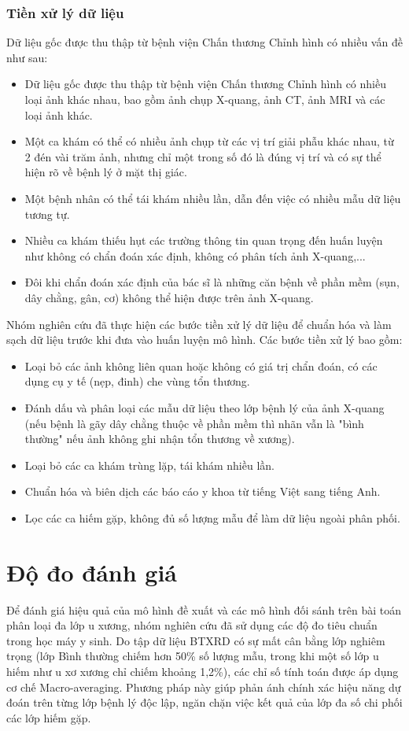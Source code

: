 \subsubsection{Tiền xử lý dữ liệu}
Dữ liệu gốc được thu thập từ bệnh viện Chấn thương Chỉnh hình có nhiều vấn đề như sau:
\begin{itemize}
    \item Dữ liệu gốc được thu thập từ bệnh viện Chấn thương Chỉnh hình có nhiều loại ảnh khác nhau, bao gồm ảnh chụp X-quang, ảnh CT, ảnh MRI và các loại ảnh khác. 
    \item Một ca khám có thể có nhiều ảnh chụp từ các vị trí giải phẫu khác nhau, từ 2 đén vài trăm ảnh, 
    nhưng chỉ một trong số đó là đúng vị trí và có sự thể hiện rõ về bệnh lý ở mặt thị giác. 
    \item Một bệnh nhân có thể tái khám nhiều lần, dẫn đến việc có nhiều mẫu dữ liệu tương tự.
    \item Nhiều ca khám thiếu hụt các trường thông tin quan trọng đến huấn luyện như không có chẩn đoán xác định, không có phân tích ảnh X-quang,...
    \item Đôi khi chẩn đoán xác định của bác sĩ là những căn bệnh về phần mềm (sụn, dây chằng, gân, cơ) không thể hiện được trên ảnh X-quang.
\end{itemize}
Nhóm nghiên cứu đã thực hiện các bước tiền xử lý dữ liệu để chuẩn hóa và làm sạch dữ liệu trước khi đưa vào huấn luyện mô hình.
Các bước tiền xử lý bao gồm:
\begin{itemize}
    \item Loại bỏ các ảnh không liên quan hoặc không có giá trị chẩn đoán, có các dụng cụ y tế (nẹp, đinh) che vùng tổn thương.
    \item Đánh dấu và phân loại các mẫu dữ liệu theo lớp bệnh lý của ảnh X-quang 
    (nếu bệnh là gãy dây chằng thuộc về phần mềm thì nhãn vẫn là "bình thường" nếu ảnh không ghi nhận tổn thương về xương).
    \item Loại bỏ các ca khám trùng lặp, tái khám nhiều lần.
    \item Chuẩn hóa và biên dịch các báo cáo y khoa từ tiếng Việt sang tiếng Anh.
    \item Lọc các ca hiếm gặp, không đủ số lượng mẫu để làm dữ liệu ngoài phân phối.
\end{itemize}

\section{Độ đo đánh giá}
Để đánh giá hiệu quả của mô hình đề xuất và các mô hình đối sánh trên bài toán phân loại đa lớp u xương, nhóm nghiên cứu đã sử dụng các độ đo tiêu chuẩn trong học máy y sinh. Do tập dữ liệu BTXRD có sự mất cân bằng lớp nghiêm trọng (lớp Bình thường chiếm hơn 50\% số lượng mẫu, trong khi một số lớp u hiếm như u xơ xương chỉ chiếm khoảng 1,2\%), các chỉ số tính toán được áp dụng cơ chế Macro-averaging. Phương pháp này giúp phản ánh chính xác hiệu năng dự đoán trên từng lớp bệnh lý độc lập, ngăn chặn việc kết quả của lớp đa số chi phối các lớp hiếm gặp.

